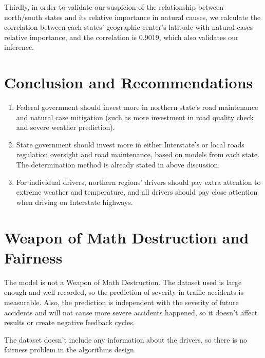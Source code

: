 \documentclass[twocolumn]{article}
\begin{document}
Thirdly, in order to validate our suspicion of the relationship between north/south states and its relative importance in natural causes, we calculate the correlation between each states' geographic center's latitude with natural cases relative importance, and the correlation is 0.9019, which also validates our inference. 


\section{Conclusion and Recommendations}
\begin{enumerate}
\item Federal government should invest more in northern state's road maintenance and natural case mitigation (such as more investment in road quality check and severe weather prediction).
\item State government should invest more in either Interstate's or local roads regulation oversight and road maintenance, based on models from each state. The determination method is already stated in above discussion.
\item For individual drivers, northern regions' drivers should pay extra attention to extreme weather and temperature, and all drivers should pay close attention when driving on Interstate highways. 
\end{enumerate}

\section{Weapon of Math Destruction and Fairness}
The model is not a Weapon of Math Destruction. The dataset used is large enough and well recorded, so the prediction of severity in traffic accidents is measurable. Also, the prediction is independent with the severity of future accidents and will not cause more severe accidents happened, so it doesn't affect results or create negative feedback cycles.

The dataset doesn't include any information about the drivers, so there is no fairness problem in the algorithms design.
\end{document}
